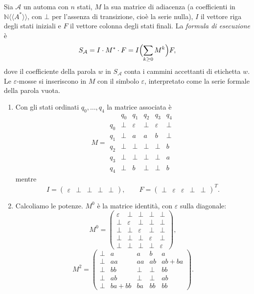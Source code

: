 \begin{sol}
Sia $\mathcal{A}$ un automa con $n$ stati, $M$ la sua matrice di adiacenza (a coefficienti in $\mathbb{N}\langle\langle A^*\rangle\rangle$, con $\bot$ per l'assenza di transizione, cioè la serie nulla), $I$ il vettore riga degli stati iniziali e $F$ il vettore colonna degli stati finali. La \emph{formula di esecuzione} è
\[
S_{\mathcal{A}}=I\cdot M^*\cdot F=I\Bigl(\sum_{k\ge 0}M^k\Bigr)F,
\]
dove il coefficiente della parola $w$ in $S_{\mathcal{A}}$ conta i cammini accettanti di etichetta $w$. Le $\varepsilon$-mosse si inseriscono in $M$ con il simbolo $\varepsilon$, interpretato come la serie formale della parola vuota.

\begin{enumerate}
\item Con gli stati ordinati $q_0,\dots,q_4$ la matrice associata è
\[
M=
\begin{array}{c|ccccc}
 & q_0 & q_1 & q_2 & q_3 & q_4\\
\hline
q_0 & \bot & \varepsilon & \bot & \varepsilon & \bot\\
q_1 & \bot & a & a & b & \bot\\
q_2 & \bot & \bot & \bot & \bot & b\\
q_3 & \bot & \bot & \bot & \bot & a\\
q_4 & \bot & b & \bot & \bot & b
\end{array}
\]
mentre
\[
I=\begin{pmatrix}\varepsilon&\bot&\bot&\bot&\bot\end{pmatrix},
\qquad
F=\begin{pmatrix}\bot&\varepsilon&\varepsilon&\bot&\bot\end{pmatrix}^{T}.
\]

\item Calcoliamo le potenze. $M^0$ è la matrice identità, con $\varepsilon$ sulla diagonale:
\[
M^0=
\begin{pmatrix}
\varepsilon & \bot & \bot & \bot & \bot\\
\bot & \varepsilon & \bot & \bot & \bot\\
\bot & \bot & \varepsilon & \bot & \bot\\
\bot & \bot & \bot & \varepsilon & \bot\\
\bot & \bot & \bot & \bot & \varepsilon
\end{pmatrix},
\]
\[
M^2=
\begin{pmatrix}
\bot & a & a & b & a\\
\bot & aa & aa & ab & ab+ba\\
\bot & bb & \bot & \bot & bb\\
\bot & ab & \bot & \bot & ab\\
\bot & ba+bb & ba & bb & bb
\end{pmatrix}.
\]


\end{enumerate}
\end{sol}
